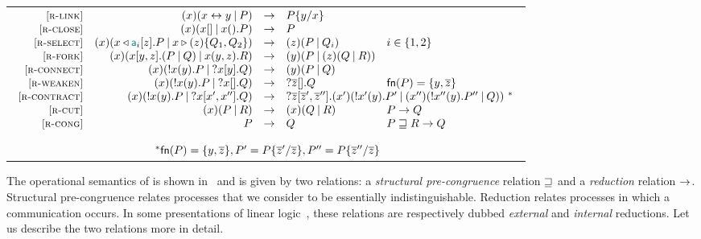 \begin{table}
\begin{tabular}{@{}c@{}}
\begin{math}
\begin{array}{rrcll}
            \RLink &
            \Cut\x{\Link\x\y}{P} & \red & P\subst\y\x \\
            \RClose &
            \Cut\x{\Close\x}{\Wait\x.P} & \red & P \\
            \RSelect &
            \Cut\x{\Select\x{\Tag_i}\z.P}{\Case\x\z{Q_1}{Q_2}} & \red & \Cut\z{P}{Q_i} & i\in\set{1,2} \\
            \RFork &
            \Cut\x{\Fork\x\y\z{P}{Q}}{\Join\x\y\z.R} & \red & \Cut\y{P}{\Cut\z{Q}{R}} \\
            \RConnect &
            \Cut\x{\Server\x\y.P}{\Client\x\y.Q} & \red & \Cut\y{P}{Q} \\
            \RWeaken &
            \Cut\x{\Server\x\y.P}{\Weaken\x.Q} & \red & \Weaken{\seqof\z}.Q
            & \fn{P} = \set{y,\seqof\z} \\
            \RContract &
            \Cut\x{\Server\x\y.P}{\Contract\x{x'}{x''}.Q} & \red &
            \multicolumn{2}{l}{
                \Contract{\seqof\z}{\seqof\z'}{\seqof\z''}.\Cut{x'}{
                    \Server{x'}\y.P'
                }{
                    \Cut{x''}{
                        \Server{x''}\y.P''
                    }{
                        Q
                    }
                }
                ~^*
            }
            \\
            \RCut &
            \Cut\x{P}{R} & \red & \Cut\x{Q}{R} & P \red Q \\
            \RCong &
            P & \red & Q & P \pcong R \red Q \\
            \\
            \multicolumn{5}{c}{
                ~^*
                \fn{P} = \set{y,\seqof\z},
                P' = P\subst{\seqof\z'}{\seqof\z},
                P'' = P\subst{\seqof\z''}{\seqof\z}
            }
            \end{array}
        \end{math}
    \end{tabular}
\end{table}

The operational semantics of \Calculus is shown in~ and
is given by two relations: a \emph{structural pre-congruence} relation $\sqsupseteq$
and a \emph{reduction} relation $\rightarrow$. Structural pre-congruence relates
processes that we consider to be essentially indistinguishable. Reduction
relates processes in which a communication occurs. In some presentations of
linear logic~\cite{BaeldeDoumaneSaurin16,Doumane17}, these relations are
respectively dubbed \emph{external} and \emph{internal} reductions. Let us
describe the two relations more in detail.

